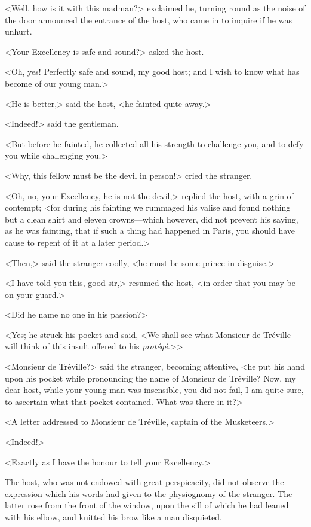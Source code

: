 <Well, how is it with this madman?> exclaimed he, turning round as the noise of the door announced the entrance of the host, who came in to inquire if he was unhurt. 

<Your Excellency is safe and sound?> asked the host. 

<Oh, yes! Perfectly safe and sound, my good host; and I wish to know what has become of our young man.> 

<He is better,> said the host, <he fainted quite away.> 

<Indeed!> said the gentleman. 

<But before he fainted, he collected all his strength to challenge you, and to defy you while challenging you.> 

<Why, this fellow must be the devil in person!> cried the stranger. 

<Oh, no, your Excellency, he is not the devil,> replied the host, with a grin of contempt; <for during his fainting we rummaged his valise and found nothing but a clean shirt and eleven crowns---which however, did not prevent his saying, as he was fainting, that if such a thing had happened in Paris, you should have cause to repent of it at a later period.> 

<Then,> said the stranger coolly, <he must be some prince in disguise.> 

<I have told you this, good sir,> resumed the host, <in order that you may be on your guard.> 

<Did he name no one in his passion?> 

<Yes; he struck his pocket and said, <We shall see what Monsieur de Tréville will think of this insult offered to his \textit{protégé}.>> 

<Monsieur de Tréville?> said the stranger, becoming attentive, <he put his hand upon his pocket while pronouncing the name of Monsieur de Tréville? Now, my dear host, while your young man was insensible, you did not fail, I am quite sure, to ascertain what that pocket contained. What was there in it?> 

<A letter addressed to Monsieur de Tréville, captain of the Musketeers.> 

<Indeed!> 

<Exactly as I have the honour to tell your Excellency.> 

The host, who was not endowed with great perspicacity, did not observe the expression which his words had given to the physiognomy of the stranger. The latter rose from the front of the window, upon the sill of which he had leaned with his elbow, and knitted his brow like a man disquieted. 

